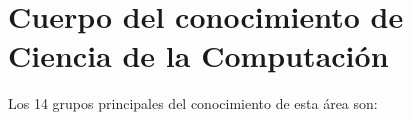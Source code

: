 \chapter{Cuerpo del conocimiento de Ciencia de la Computación}\label{chap:cs-BOK}
Los 14 grupos principales del conocimiento de esta área son:


